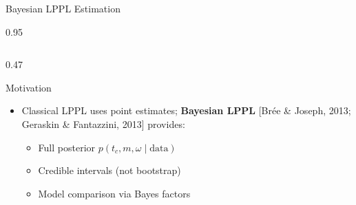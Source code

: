 \documentclass[9pt, aspectratio=169, t]{beamer}
\begin{document}
\begin{frame}{Bayesian LPPL Estimation}
    \begin{cminipage}{0.95\textwidth}
    {\scriptsize
    \begin{columns}[T]
        \begin{column}{0.47\textwidth}
            \begin{block}{Motivation}
                \begin{itemize}\setlength{\itemsep}{0pt}
                    \item Classical LPPL uses point estimates; \textbf{Bayesian LPPL} [Brée \& Joseph, 2013; Geraskin \& Fantazzini, 2013] provides:
                    \begin{itemize}\setlength{\itemsep}{0pt}
                        \item Full posterior $p(t_c, m, \omega \mid \text{data})$
                        \item Credible intervals (not bootstrap)
                        \item Model comparison via Bayes factors
                    \end{itemize}
                \end{itemize}
            \end{block}


\end{column}
\end{columns}}
\end{cminipage}
\end{frame}
\end{document}
